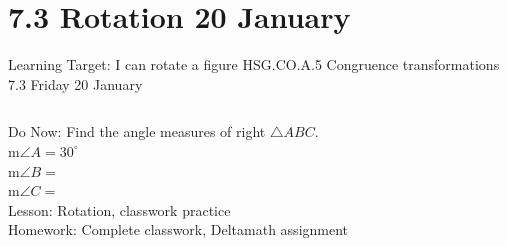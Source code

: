 \section{7.3 Rotation \hfill 20 January \,}
\begin{frame}{Learning Target: I can rotate a figure}
  {HSG.CO.A.5 Congruence transformations \hfill \alert{7.3 Friday 20 January}}
  \begin{columns}
    Do Now: Find the angle measures of right $\triangle ABC$. \\
    m$\angle A= 30^\circ$ \\
    m$\angle B=$ \\
    m$\angle C=$ \\[0.5cm]
    Lesson: Rotation, classwork practice \\
    Homework: Complete classwork, Deltamath assignment
    \begin{flushright}
    \end{flushright}
  \end{columns}
\end{frame}

